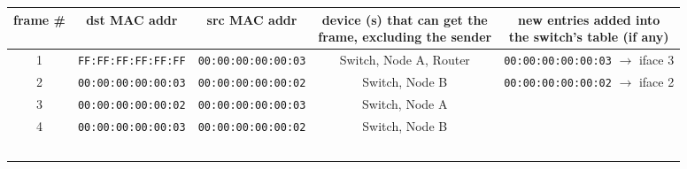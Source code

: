 \documentclass{report}
\begin{document}
\begin{problem}
\begin{enumerate}
  \begin{table}[H]
    \centering
    \begin{tabular*}{1.0\textwidth}{c | c | c | c | c}
      \hline
      frame \# & dst MAC addr               & src MAC addr               & \pbox{15cm}{device (s) that can get the \\frame, excluding the sender} & \pbox{20cm}{new entries added into \\the switch's table (if any)} \\ \hline
      1        & \texttt{FF:FF:FF:FF:FF:FF} & \texttt{00:00:00:00:00:03} & Switch, Node A, Router                                                 & \texttt{00:00:00:00:00:03} $\rightarrow$ iface 3 \\  
      2        & \texttt{00:00:00:00:00:03} & \texttt{00:00:00:00:00:02} & Switch, Node B                                                         & \texttt{00:00:00:00:00:02} $\rightarrow$ iface 2 \\ 
      3        & \texttt{00:00:00:00:00:02} & \texttt{00:00:00:00:00:03} & Switch, Node A                                                         &                                               \\ 
      4        & \texttt{00:00:00:00:00:03} & \texttt{00:00:00:00:00:02} & Switch, Node B                                                         &                                               \\ 
               &                            &                            &                                                                        &                                               \\ 
               &                            &                            &                                                                        &                                               \\ 
               &                            &                            &                                                                        &                                               \\ 
               &                            &                            &                                                                        &                                               \\ 
               &                            &                            &                                                                        &                                               \\ 

\end{tabular*}
\end{table}
\end{enumerate}
\end{problem}
\end{document}
